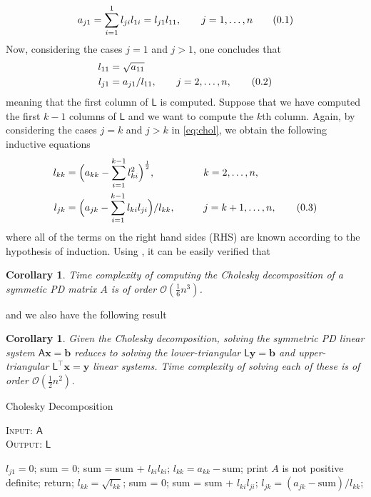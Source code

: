 \documentclass[10pt]{article}
\newtheorem{cor}[thm]{Corollary}
\theoremstyle{definition}
\newcommand\eqnum{\addtocounter{equation}{1}\tag{\arabic{section}.\arabic{equation}}}
\begin{document}
\begin{equation*}
a_{j1} = \sum_{i=1}^{1}l_{ji}l_{1i} = l_{j1}l_{11}, \qquad j = 1,\dots, n
\eqnum
\end{equation*}
Now, considering the cases $j=1$ and $j>1$, one concludes that
\begin{align*}
l_{11} &= \sqrt{a_{11} } \\
l_{j1} &= a_{j1}/l_{11}, \qquad j=2,\dots,n,
\eqnum
\end{align*}
meaning that the first column of $\mathsf{L}$ is computed. Suppose that we have computed the first $k-1$ columns of $\mathsf{L}$ and we want to compute the $k$th column. Again, by considering the cases $j=k$ and $j>k$ in \cref{eq:chol}, we obtain the following inductive equations
\begin{alignat*}{2}
l_{kk} &= \Big(a_{kk} - \sum_{i=1}^{k-1}l_{ki}^2\Big)^{\frac{1}{2}}, && k=2,\dots,n, \\ 
l_{jk} &= \Big(a_{jk}-\sum_{i=1}^{k-1}l_{ki}l_{ji}\Big)/l_{kk}, \qquad && j = k+1,\dots, n,
\eqnum
\label{eq:chol:alg}
\end{alignat*}
where all of the terms on the right hand sides (RHS) are known according to the hypothesis of induction. Using , it can be easily verified that
\begin{cor}
Time complexity of computing the Cholesky decomposition of a symmetic PD matrix $A$ is of order $\mathcal{O}(\frac{1}{6}n^3)$.
\end{cor}
\noindent
and we also have the following result
\begin{cor}
Given the Cholesky decomposition, solving the symmetric PD linear system $\mathsf{A}\mathbf{x}=\mathbf{b}$ reduces to solving the lower-triangular $\mathsf{L}\mathbf{y} = \mathbf{b}$ and upper-triangular $\mathsf{L}^{\top} \mathbf{x} = \mathbf{y}$  linear systems. Time complexity of solving each of these is of order $\mathcal{O}(\frac{1}{2}n^2)$.
\end{cor}

\begin{algorithm}[t]
\caption{Cholesky Decomposition}\label{alg:chol}
\hspace*{\algorithmicindent} {\scshape Input}: $\mathsf{A}$\\
\hspace*{\algorithmicindent} {\scshape Output}: $\mathsf{L}$
\begin{algorithmic}[1]
	\State $l_{j1} = 0$;
\EndFor
{}
	\State sum = $0$;
		\State sum = sum + $l_{ki}l_{ki}$;
	\EndFor
	\State $l_{kk} = a_{kk}- \text{sum}$;
		\State print $A$ is not positive definite;
		\State return;
    \EndIf
	\State $l_{kk} = \sqrt{l_{kk}}$;
    	\State sum = $0$;
    		\State sum = sum + $l_{ki}l_{ji}$;
    	\EndFor
    	\State $l_{jk}=(a_{jk}-\text{sum})/l_{kk}$;
    \EndFor
\EndFor
\end{algorithmic}
\end{algorithm}
\end{document}
